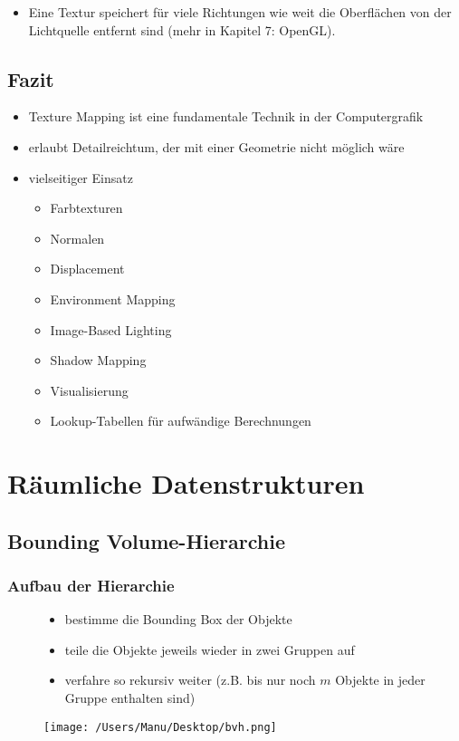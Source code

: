 \documentclass[paper=a4, fontsize=11pt]{scrartcl} %
\numberwithin{equation}{section} %
\numberwithin{figure}{section} %
\numberwithin{table}{section} %
\begin{document}
\begin{itemize}
\item Eine Textur speichert für viele Richtungen wie weit die Oberflächen von der Lichtquelle entfernt sind (mehr in Kapitel 7: OpenGL).
\end{itemize}

\subsection{Fazit}

\begin{itemize}
\item Texture Mapping ist eine fundamentale Technik in der Computergrafik
\item erlaubt Detailreichtum, der mit einer Geometrie nicht möglich wäre
\item vielseitiger Einsatz
\begin{itemize}
\item Farbtexturen
\item Normalen
\item Displacement
\item Environment Mapping
\item Image-Based Lighting
\item Shadow Mapping
\item Visualisierung
\item Lookup-Tabellen für aufwändige Berechnungen
\end{itemize}
\end{itemize}
\newpage
\section{Räumliche Datenstrukturen}

\subsection{Bounding Volume-Hierarchie}

\subsubsection{Aufbau der Hierarchie}

\begin{figure}[htbp]
\begin{minipage}[t]{6cm}
\vspace{0pt}
\begin{itemize}
\item bestimme die Bounding Box der Objekte
\item teile die Objekte jeweils wieder in zwei Gruppen auf
\item verfahre so rekursiv weiter (z.B. bis nur noch $m$ Objekte in jeder Gruppe enthalten sind)
\end{itemize}
\end{minipage}
\hfill
\begin{minipage}[t]{6cm}
\vspace{0pt}
\centering
\texttt{[image: /Users/Manu/Desktop/bvh.png]}
\end{minipage}
\end{figure}
\end{document}

